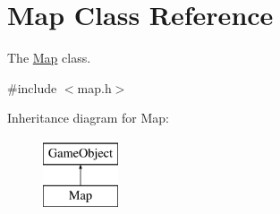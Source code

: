 \hypertarget{class_map}{\section{\-Map \-Class \-Reference}
\label{class_map}
}


\-The \hyperlink{class_map}{\-Map} class.  




{\ttfamily \#include $<$map.\-h$>$}

\-Inheritance diagram for \-Map\-:\begin{figure}[H]
\begin{center}
\leavevmode
\includegraphics[height=2.000000cm]{class_map}
\end{center}
\end{figure}

